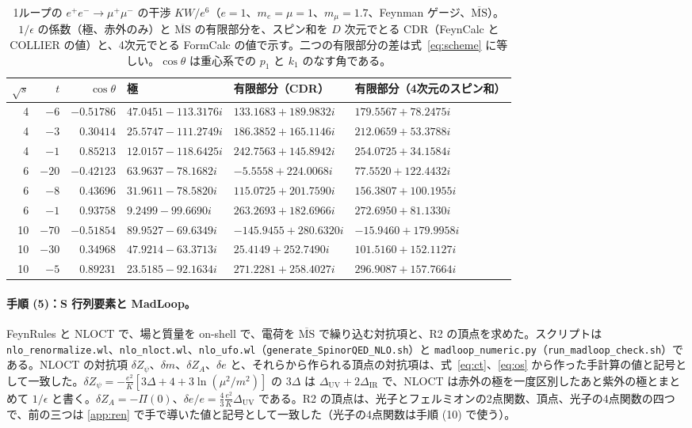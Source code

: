 \documentclass[a4paper,10pt]{ltjsarticle}
\newcommand{\MSbar}{\overline{\mathrm{MS}}}
\newcommand{\DUV}{\Delta_{\mathrm{UV}}}
\newcommand{\DIR}{\Delta_{\mathrm{IR}}}
\begin{document}
\begin{table}[tbp]
\centering\small
\caption{1ループの $e^+e^-\to\mu^+\mu^-$ の干渉 $KW/e^6$（$e=1$、$m_e=\mu=1$、$m_\mu=1.7$、Feynman ゲージ、$\MSbar$）。$1/\epsilon$ の係数（極、赤外のみ）と $\MSbar$ の有限部分を、スピン和を $D$ 次元でとる CDR（FeynCalc と COLLIER の値）と、4次元でとる FormCalc の値で示す。二つの有限部分の差は式~\eqref{eq:scheme} に等しい。$\cos\theta$ は重心系での $p_1$ と $k_1$ のなす角である。}
\label{tab:scat}
\begin{tabular}{rrrlll}
\toprule
$\sqrt s$ & $t$ & $\cos\theta$ & 極 & 有限部分（CDR） & 有限部分（4次元のスピン和） \\
\midrule
4 & $-6$ & $-0.51786$ & $47.0451-113.3176i$ & $133.1683+189.9832i$ & $179.5567+78.2475i$ \\
4 & $-3$ & $0.30414$ & $25.5747-111.2749i$ & $186.3852+165.1146i$ & $212.0659+53.3788i$ \\
4 & $-1$ & $0.85213$ & $12.0157-118.6425i$ & $242.7563+145.8942i$ & $254.0725+34.1584i$ \\
6 & $-20$ & $-0.42123$ & $63.9637-78.1682i$ & $-5.5558+224.0068i$ & $77.5520+122.4432i$ \\
6 & $-8$ & $0.43696$ & $31.9611-78.5820i$ & $115.0725+201.7590i$ & $156.3807+100.1955i$ \\
6 & $-1$ & $0.93758$ & $9.2499-99.6690i$ & $263.2693+182.6966i$ & $272.6950+81.1330i$ \\
10 & $-70$ & $-0.51854$ & $89.9527-69.6349i$ & $-145.9455+280.6320i$ & $-15.9460+179.9958i$ \\
10 & $-30$ & $0.34968$ & $47.9214-63.3713i$ & $25.4149+252.7490i$ & $101.5160+152.1127i$ \\
10 & $-5$ & $0.89231$ & $23.5185-92.1634i$ & $271.2281+258.4027i$ & $296.9087+157.7664i$ \\
\bottomrule
\end{tabular}
\end{table}

\paragraph{手順 (5)：S 行列要素と MadLoop。}FeynRules と NLOCT で、場と質量を on-shell で、電荷を $\MSbar$ で繰り込む対抗項と、R2 の頂点を求めた。スクリプトは \texttt{nlo\_renormalize.wl}、\texttt{nlo\_nloct.wl}、\texttt{nlo\_ufo.wl}（\texttt{generate\_SpinorQED\_NLO.sh}）と \texttt{madloop\_numeric.py}（\texttt{run\_madloop\_check.sh}）である。NLOCT の対抗項 $\delta Z_\psi$、$\delta m$、$\delta Z_A$、$\delta e$ と、それらから作られる頂点の対抗項は、式~\eqref{eq:ct}、\eqref{eq:os} から作った手計算の値と記号として一致した。$\delta Z_\psi=-\frac{e^2}{K}[3\Delta+4+3\ln(\mu^2/m^2)]$ の $3\Delta$ は $\DUV+2\DIR$ で、NLOCT は赤外の極を一度区別したあと紫外の極とまとめて $1/\epsilon$ と書く。$\delta Z_A=-\Pi(0)$、$\delta e/e=\frac43\frac{e^2}{K}\DUV$ である。R2 の頂点は、光子とフェルミオンの2点関数、頂点、光子の4点関数の四つで、前の三つは \ref{app:ren} で手で導いた値と記号として一致した（光子の4点関数は手順 (10) で使う）。
\end{document}
